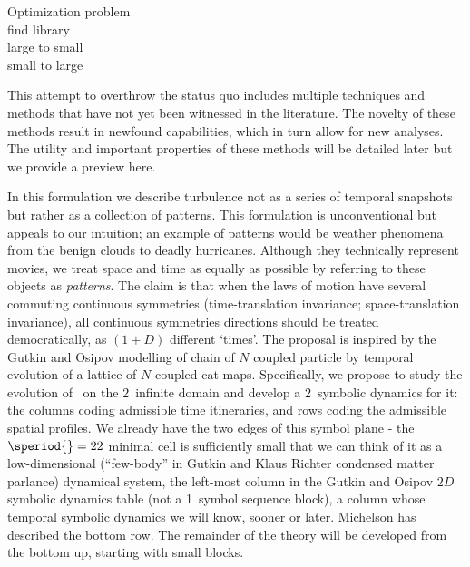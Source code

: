 \begin{description}
{\begin{description}
\item[Optimization problem]

\item[find library]
\item[large to small]
\item[small to large]
\end{description}
This attempt to overthrow the status quo includes multiple techniques
and methods that have not yet been witnessed in the literature.
The novelty of these methods result in newfound capabilities, which in turn allow for
new analyses. The utility and important properties of these methods
will be detailed later but we provide a preview here.

In this formulation we describe turbulence not as a series of temporal
snapshots but rather as a collection of {\spt} patterns. This formulation
is unconventional but appeals to our intuition; an example of {\spt} patterns
would be weather phenomena from the benign clouds to deadly hurricanes. Although
they technically represent movies, we treat space and time as equally as possible
by referring to these objects as {\spt} \emph{patterns}.
The claim is that when the laws of motion
have several commuting continuous symmetries (time-translation
invariance; space-translation invariance), all continuous symmetries
directions should be treated democratically, as $(1+D)$ different
`times'. The proposal is inspired by the Gutkin and Osipov 
modelling of chain of $N$ coupled particle by temporal evolution of a
lattice of $N$ coupled cat maps.
Specifically, we propose to study the evolution of \KS\ on the $2$\dmn\ infinite
{\spt}domain and develop a $2$\dmn\ symbolic dynamics for it: the
columns coding admissible time itineraries, and rows coding the
admissible spatial profiles.
We already have the two edges of this symbol plane - the $\speriod{}=22$ minimal
cell is sufficiently small that we can think of it as
a low-dimensional (``few-body'' in Gutkin and Klaus
Richter condensed matter parlance)
dynamical system, the left-most column in the Gutkin and
Osipov $2D$ symbolic dynamics {\spt} table (not a
1\dmn\ symbol sequence block), a column whose temporal symbolic dynamics
we will know, sooner or later. Michelson has described the
bottom row. The remainder of the theory will be developed from the
bottom up, starting with small {\spt} blocks.


}
\end{description}
